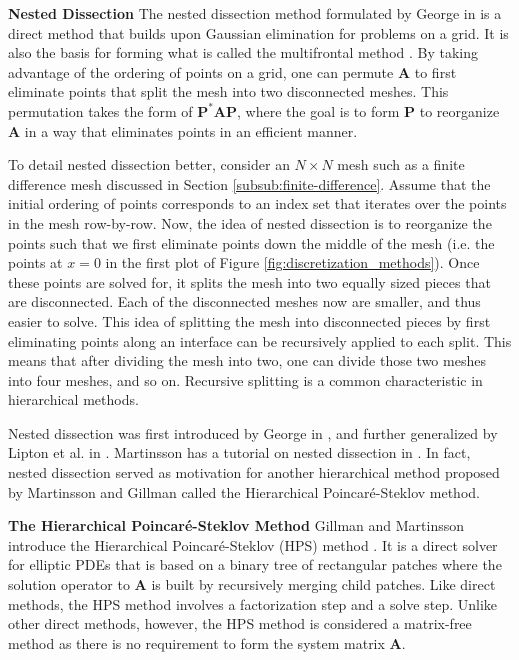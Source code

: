 
{\bf Nested Dissection}
The nested dissection method formulated by George in \citep{george1973nested} is a direct method that builds upon Gaussian elimination for problems on a grid. It is also the basis for forming what is called the multifrontal method \citep{liu1992multifrontal, davis2004algorithm}. By taking advantage of the ordering of points on a grid, one can permute $\textbf{A}$ to first eliminate points that split the mesh into two disconnected meshes. This permutation takes the form of $\textbf{P}^* \textbf{A} \textbf{P}$, where the goal is to form $\textbf{P}$ to reorganize $\textbf{A}$ in a way that eliminates points in an efficient manner.

To detail nested dissection better, consider an $N \times N$ mesh such as a finite difference mesh discussed in Section \ref{subsub:finite-difference}. Assume that the initial ordering of points corresponds to an index set that iterates over the points in the mesh row-by-row. Now, the idea of nested dissection is to reorganize the points such that we first eliminate points down the middle of the mesh (i.e. the points at $x = 0$ in the first plot of Figure \ref{fig:discretization_methods}). Once these points are solved for, it splits the mesh into two equally sized pieces that are disconnected. Each of the disconnected meshes now are smaller, and thus easier to solve. This idea of splitting the mesh into disconnected pieces by first eliminating points along an interface can be recursively applied to each split. This means that after dividing the mesh into two, one can divide those two meshes into four meshes, and so on. Recursive splitting is a common characteristic in hierarchical methods.

Nested dissection was first introduced by George in \citep{george1973nested}, and further generalized by Lipton et al. in \citep{lipton1979generalized}. Martinsson has a tutorial on nested dissection in \citep{martinsson2019fast}. In fact, nested dissection served as motivation for another hierarchical method proposed by Martinsson and Gillman called the Hierarchical Poincaré-Steklov method.


{\bf The Hierarchical Poincaré-Steklov Method}
Gillman and Martinsson introduce the Hierarchical Poincaré-Steklov (HPS) method \citep{martinsson2004fast, MARTINSSON2013460, gillman2014direct, martinsson2015hierarchical}. It is a direct solver for elliptic PDEs that is based on a binary tree of rectangular patches where the solution operator to $\textbf{A}$ is built by recursively merging child patches. Like direct methods, the HPS method involves a factorization step and a solve step. Unlike other direct methods, however, the HPS method is considered a matrix-free method as there is no requirement to form the system matrix $\textbf{A}$.


